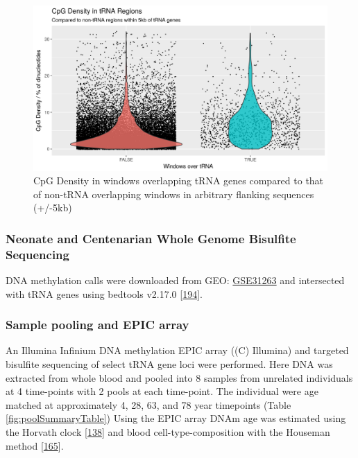 \documentclass[
]{book}
\begin{document}
\begin{figure}

{\centering \includegraphics[width=1\linewidth]{figs/CpGcountBGvstRNAPlot} 

}

\caption{CpG Density in windows overlapping tRNA genes compared to that of non-tRNA overlapping windows in arbitrary flanking sequences (+/-5kb)}\label{fig:CpGcountBGvstRNAPlot}
\end{figure}



\hypertarget{neonate-and-centenarian-whole-genome-bisulfite-sequencing}{%
\subsubsection{Neonate and Centenarian Whole Genome Bisulfite Sequencing}\label{neonate-and-centenarian-whole-genome-bisulfite-sequencing}}

DNA methylation calls were downloaded from GEO: \href{https://www.ncbi.nlm.nih.gov/geo/query/acc.cgi?acc=GSE31263}{GSE31263} and intersected with tRNA genes using bedtools v2.17.0 {[}\protect\hyperlink{ref-Quinlan2010}{194}{]}.

\hypertarget{sample-pooling-and-epic-array}{%
\subsubsection{Sample pooling and EPIC array}\label{sample-pooling-and-epic-array}}

An Illumina Infinium DNA methylation EPIC array ((C) Illumina) and targeted bisulfite sequencing of select tRNA gene loci were performed.
Here DNA was extracted from whole blood and pooled into 8 samples from unrelated individuals at 4 time-points with 2 pools at each time-point.
The individual were age matched at approximately 4, 28, 63, and 78 year timepoints (Table \ref{fig:poolSummaryTable})
Using the EPIC array DNAm age was estimated using the Horvath clock {[}\protect\hyperlink{ref-Horvath2013}{138}{]} and blood cell-type-composition with the Houseman method {[}\protect\hyperlink{ref-Houseman2012}{165}{]}.
\end{document}
